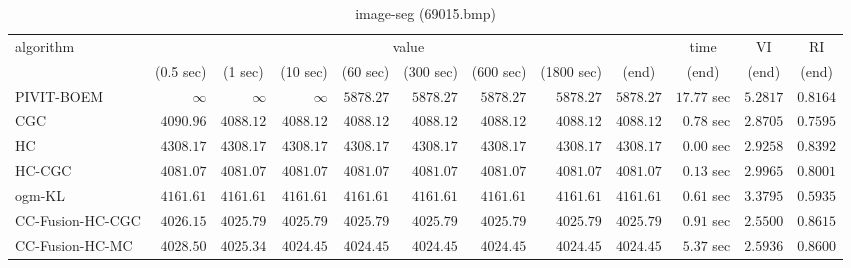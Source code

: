 \begin{table}[H]
\scriptsize
\centering
\caption{image-seg (69015.bmp)}
\label{tab:anytimetable-image-seg-69015.bmp}
\begin{tabular}{lrrrrrrrrrrr}
\toprule
           algorithm &                                   \multicolumn{8}{c}{value} & \multicolumn{1}{c}{time}    & \multicolumn{1}{c}{VI}  & \multicolumn{1}{c}{RI} \\  
\cmidrule(lr){2-9}\cmidrule(lr){10-10} \cmidrule(lr){11-11} \cmidrule(lr){12-12}   
                     & \multicolumn{1}{c}{(0.5 sec)} & \multicolumn{1}{c}{(1 sec)} & \multicolumn{1}{c}{(10 sec)} & \multicolumn{1}{c}{(60 sec)} & \multicolumn{1}{c}{(300 sec)} & \multicolumn{1}{c}{(600 sec)} & \multicolumn{1}{c}{(1800 sec)} & \multicolumn{1}{c}{(end)} & \multicolumn{1}{c}{(end)}    & \multicolumn{1}{c}{(end)}   & \multicolumn{1}{c}{(end)}  \\ \midrule 
          PIVIT-BOEM & $\infty$ & $\infty$ & $\infty$ & $      5878.27$ & $      5878.27$ & $      5878.27$ & $      5878.27$ & $      5878.27$ & $        17.77$ sec    & $       5.2817$  & $       0.8164$ \\ 
                 CGC & $      4090.96$ & $      4088.12$ & $      4088.12$ & $      4088.12$ & $      4088.12$ & $      4088.12$ & $      4088.12$ & $      4088.12$ & $         0.78$ sec    & $       2.8705$  & $       0.7595$ \\ 
                  HC & $      4308.17$ & $      4308.17$ & $      4308.17$ & $      4308.17$ & $      4308.17$ & $      4308.17$ & $      4308.17$ & $      4308.17$ & $         0.00$ sec    & $       2.9258$  & $       0.8392$ \\ 
              HC-CGC & $      4081.07$ & $      4081.07$ & $      4081.07$ & $      4081.07$ & $      4081.07$ & $      4081.07$ & $      4081.07$ & $      4081.07$ & $         0.13$ sec    & $       2.9965$  & $       0.8001$ \\ 
              ogm-KL & $      4161.61$ & $      4161.61$ & $      4161.61$ & $      4161.61$ & $      4161.61$ & $      4161.61$ & $      4161.61$ & $      4161.61$ & $         0.61$ sec    & $       3.3795$  & $       0.5935$ \\ 
    CC-Fusion-HC-CGC & $      4026.15$ & $      4025.79$ & $      4025.79$ & $      4025.79$ & $      4025.79$ & $      4025.79$ & $      4025.79$ & $      4025.79$ & $         0.91$ sec    & $       2.5500$  & $       0.8615$ \\ 
     CC-Fusion-HC-MC & $      4028.50$ & $      4025.34$ & $      4024.45$ & $      4024.45$ & $      4024.45$ & $      4024.45$ & $      4024.45$ & $      4024.45$ & $         5.37$ sec    & $       2.5936$  & $       0.8600$ \\ 

\end{tabular}
\end{table}
